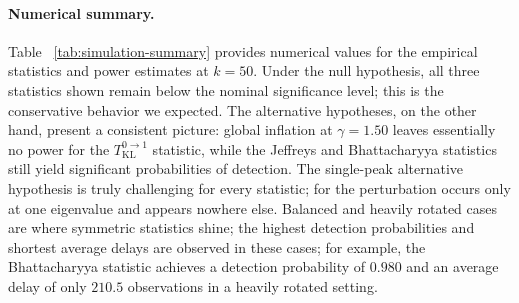 \documentclass[11pt,a4paper]{article}
\newcommand{\KL}{\mathrm{KL}}
\begin{document}
\paragraph{Numerical summary.}
Table ~\ref{tab:simulation-summary} provides numerical values for the empirical statistics and
power estimates at $k=50$. Under the null hypothesis, all three statistics shown
remain below the nominal significance level; this is the
conservative behavior we expected. The alternative hypotheses, on the other hand, present a consistent picture: global
inflation at $\gamma=1.50$ leaves essentially no
power for the $T_{\KL}^{0\to 1}$ statistic, while the Jeffreys and Bhattacharyya statistics still yield significant
probabilities of detection. The single-peak alternative hypothesis is truly
challenging for every statistic; for the perturbation occurs only at one eigenvalue and
appears nowhere else. Balanced and heavily rotated cases are
where symmetric statistics shine; the highest detection probabilities and
shortest average delays are observed in these cases; for example, the Bhattacharyya
statistic achieves a detection
probability of $0.980$ and an average delay of only $210.5$ observations in a heavily rotated setting.
\end{document}
